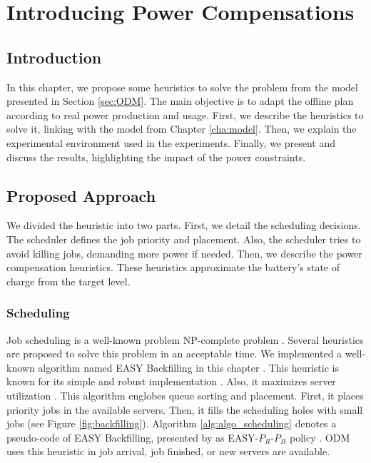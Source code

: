 \chapter{Introducing Power Compensations}
\label{cha:power_compensations}

\minitoc

\section{Introduction}

In this chapter, we propose some heuristics to solve the problem from the model presented in Section \ref{sec:ODM}. The main objective is to adapt the offline plan according to real power production and usage. First, we describe the heuristics to solve it, linking with the model from Chapter \ref{cha:model}. Then, we explain the experimental environment used in the experiments. Finally, we present and discuss the results, highlighting the impact of the power constraints.

\section{Proposed Approach}

We divided the heuristic into two parts. First, we detail the scheduling decisions. The scheduler defines the job priority and placement. Also, the scheduler tries to avoid killing jobs, demanding more power if needed. Then, we describe the power compensation heuristics. These heuristics approximate the battery's state of charge from the target level.

\subsection{Scheduling}
\label{sec:heuristic_scheduling}

Job scheduling is a well-known problem NP-complete problem \cite{robert2009introduction, agrawal2021energy}. Several heuristics are proposed to solve this problem in an acceptable time. We implemented a well-known algorithm named EASY Backfilling in this chapter \cite{mu2001utilization}. This heuristic is known for its simple and robust implementation \cite{srinivasan2002characterization}. Also, it maximizes server utilization \cite{srinivasan2002characterization}. This algorithm englobes queue sorting and placement. First, it places priority jobs in the available servers. Then, it fills the scheduling holes with small jobs (see Figure \ref{fig:backfilling}). Algorithm \ref{alg:algo_scheduling} denotes a pseudo-code of EASY Backfilling, presented by \citeauthor{lelong2018tuning} as EASY-$P_{R}$-$P_{B}$ policy \cite{lelong2018tuning}. ODM uses this heuristic in job arrival, job finished, or new servers are available. 


